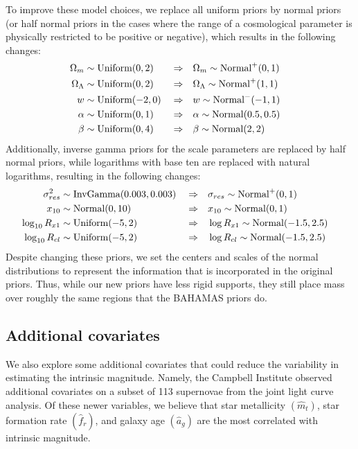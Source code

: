 To improve these model choices, we replace all uniform priors by normal priors (or half normal priors in the cases where the range of a cosmological parameter is physically restricted to be positive or negative), which results in the following changes:
\begin{align}
\Omega_m &\sim \text{Uniform}(0, 2) && \Rightarrow && \Omega_m \sim \text{Normal}^{+}(0, 1) && \label{eq:baseline_prior_new} \\\nonumber 
\Omega_\Lambda &\sim \text{Uniform}(0, 2) && \Rightarrow && \Omega_\Lambda \sim \text{Normal}^{+}(1, 1) && \\\nonumber
w &\sim \text{Uniform}(-2, 0) && \Rightarrow && w \sim \text{Normal}^{-}(-1, 1) && \\\nonumber
\alpha &\sim \text{Uniform}(0, 1) && \Rightarrow && \alpha \sim \text{Normal}(0.5, 0.5) && \\\nonumber 
\beta &\sim \text{Uniform}(0, 4) && \Rightarrow && \beta \sim \text{Normal}(2, 2)
\end{align}
Additionally, inverse gamma priors for the scale parameters are replaced by half normal priors, while logarithms with base ten are replaced with natural logarithms, resulting in the following changes:
\begin{align}
\sigma_{res}^2 &\sim \text{InvGamma}(0.003, 0.003) && \Rightarrow && \sigma_{res} \sim \text{Normal}^{+}(0, 1) && \label{eq:baseline_hyperprior_new} \\\nonumber
x_{10} &\sim \text{Normal}(0, 10) && \Rightarrow && x_{10} \sim \text{Normal}(0, 1) && \\\nonumber 
\log_{10} R_{x1} &\sim \text{Uniform}(-5, 2) && \Rightarrow && \log R_{x1} \sim \text{Normal}(-1.5, 2.5) && \\\nonumber
\log_{10} R_{cl} &\sim \text{Uniform}(-5,2) && \Rightarrow && \log R_{cl} \sim \text{Normal}(-1.5, 2.5)
\end{align}
Despite changing these priors, we set the centers and scales of the normal distributions to represent the information that is incorporated in the original \citet{Shariff+others:2016} priors. Thus, while our new priors have less rigid supports, they still place mass over roughly the same regions that the BAHAMAS priors do.

\subsection{Additional covariates}
\label{sec:ode_new_cov}

We also explore some additional covariates that could reduce the variability in estimating the intrinsic magnitude. Namely, the Campbell Institute observed additional covariates on a subset of 113 supernovae from the joint light curve analysis. Of these newer variables, we believe that star metallicity $(\hat{m}_t)$, star formation rate $(\hat{f}_r)$, and galaxy age $(\hat{a}_g)$ are the most correlated with intrinsic magnitude. 

